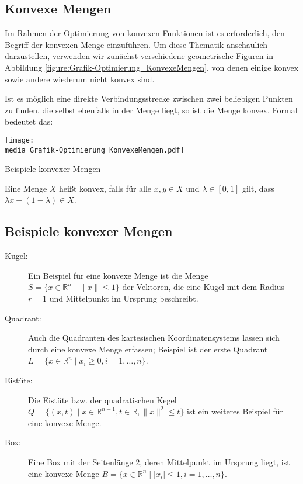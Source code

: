 \subsection{Konvexe Mengen}
Im Rahmen der Optimierung von konvexen Funktionen ist es erforderlich, den Begriff der konvexen Menge einzuführen. Um diese Thematik anschaulich darzustellen, verwenden wir zunächst verschiedene geometrische Figuren in Abbildung \ref{figure:Grafik-Optimierung_KonvexeMengen}, von denen einige konvex sowie andere wiederum nicht konvex sind.

Ist es möglich eine direkte Verbindungsstrecke zwischen zwei beliebigen Punkten zu finden, die selbst ebenfalls in der Menge liegt, so ist die Menge konvex. Formal bedeutet das:

\begin{dsafigure}
\begin{center}
\texttt{[image: \\media Grafik-Optimierung\_KonvexeMengen.pdf]}
\label{figure:Grafik-Optimierung_KonvexeMengen}
\caption{Beispiele konvexer Mengen}
\end{center}
\end{dsafigure}

\begin{Def}
Eine Menge $X$ heißt konvex, falls für alle $x, y \in X$ und $\lambda \in [0,1]$ gilt, dass $\lambda x + (1 - \lambda) \in X$.
\end{Def}

\subsection{Beispiele konvexer Mengen}
\begin{description}
\item[Kugel:]
Ein Beispiel für eine konvexe Menge ist die Menge $S = \{x \in \mathbb{R}^{n} \mid \lVert x \rVert \le 1\}$ der Vektoren, die eine Kugel mit dem Radius $r = 1$ und Mittelpunkt im Ursprung beschreibt.
\item[Quadrant:] Auch die Quadranten des kartesischen Koordinatensystems lassen sich durch eine konvexe Menge erfassen; Beispiel ist der erste Quadrant $L = \{ x \in \mathbb{R}^{n} \mid x_i \ge 0, i=1,\dots,n\}$.
\item[Eistüte:] Die Eistüte bzw. der quadratischen Kegel $Q = \{(x, t) \mid x\in \mathbb{R}^{n-1}, t\in \mathbb{R}, \lVert x\rVert ^{2} \le t\}$ ist ein weiteres Beispiel für eine konvexe Menge.
\item[Box:] Eine Box mit der Seitenlänge 2, deren Mittelpunkt im Ursprung liegt, ist eine konvexe Menge $B = \{x \in \mathbb{R}^{n} \mid |x_{i}| \le 1, i = 1, \dots, n\}$.
\end{description}

